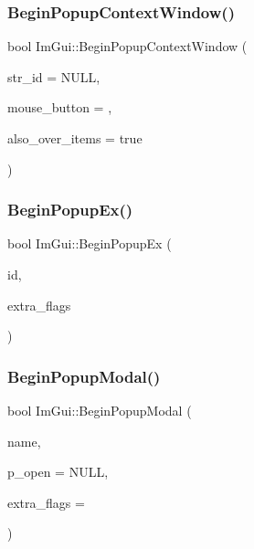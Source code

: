 \hypertarget{namespace_im_gui_acf98c99f041ea341d0328e071c56411b}{}\label{namespace_im_gui_acf98c99f041ea341d0328e071c56411b} 
\subsubsection{\texorpdfstring{Begin\+Popup\+Context\+Window()}{BeginPopupContextWindow()}}
{\footnotesize\ttfamily bool Im\+Gui\+::\+Begin\+Popup\+Context\+Window (\begin{DoxyParamCaption}\item[{const char $\ast$}]{str\+\_\+id = {\ttfamily NULL},  }\item[{int}]{mouse\+\_\+button = {},  }\item[{bool}]{also\+\_\+over\+\_\+items = {\ttfamily true} }\end{DoxyParamCaption})}

\hypertarget{namespace_im_gui_a89da3a22300e8293257b6cfdf1b83b7a}{}\label{namespace_im_gui_a89da3a22300e8293257b6cfdf1b83b7a} 
\subsubsection{\texorpdfstring{Begin\+Popup\+Ex()}{BeginPopupEx()}}
{\footnotesize\ttfamily bool Im\+Gui\+::\+Begin\+Popup\+Ex (\begin{DoxyParamCaption}\item[{Im\+Gui\+ID}]{id,  }\item[{Im\+Gui\+Window\+Flags}]{extra\+\_\+flags }\end{DoxyParamCaption})}

\hypertarget{namespace_im_gui_aa70aaf1dacf5702f85feca6f729a307a}{}\label{namespace_im_gui_aa70aaf1dacf5702f85feca6f729a307a} 
\subsubsection{\texorpdfstring{Begin\+Popup\+Modal()}{BeginPopupModal()}}
{\footnotesize\ttfamily bool Im\+Gui\+::\+Begin\+Popup\+Modal (\begin{DoxyParamCaption}\item[{const char $\ast$}]{name,  }\item[{bool $\ast$}]{p\+\_\+open = {\ttfamily NULL},  }\item[{Im\+Gui\+Window\+Flags}]{extra\+\_\+flags = {} }\end{DoxyParamCaption})}

